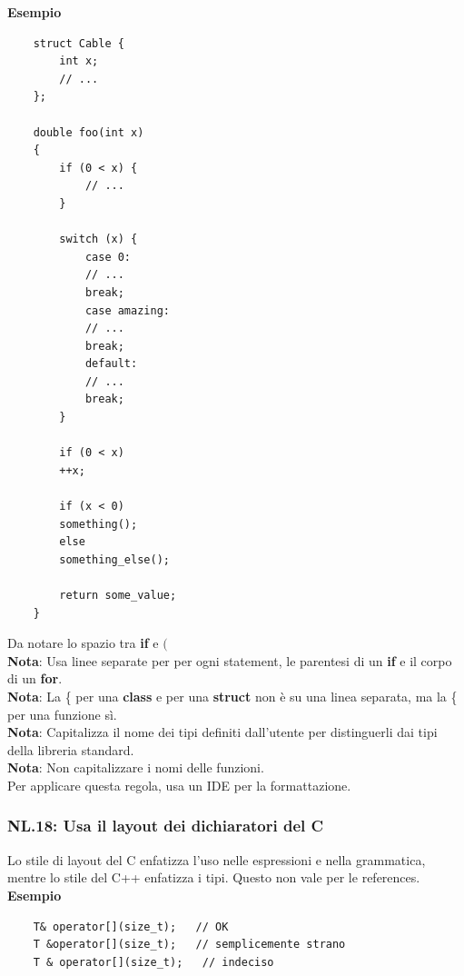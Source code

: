 \textsf{\small \textbf{Esempio}}

\begin{lstlisting}
	struct Cable {
		int x;
		// ...
	};
	
	double foo(int x)
	{
		if (0 < x) {
			// ...
		}
		
		switch (x) {
			case 0:
			// ...
			break;
			case amazing:
			// ...
			break;
			default:
			// ...
			break;
		}
		
		if (0 < x)
		++x;
		
		if (x < 0)
		something();
		else
		something_else();
		
		return some_value;
	}
\end{lstlisting}

\textsf{\small Da notare lo spazio tra \textbf{if} e \textbf{$($}} \\

\textsf{\small \textbf{Nota}: Usa linee separate per per ogni statement, le parentesi di un \textbf{if} e il corpo di un \textbf{for}.} \\

\textsf{\small \textbf{Nota}: La \{ per una \textbf{class} e per una \textbf{struct} non è su una linea separata, ma la \{ per una funzione sì.} \\

\textsf{\small \textbf{Nota}: Capitalizza il nome dei tipi definiti dall'utente per distinguerli dai tipi della libreria standard.} \\

\textsf{\small \textbf{Nota}: Non capitalizzare i nomi delle funzioni.} \\

\textsf{\small Per applicare questa regola, usa un IDE per la formattazione.} \\

\subsubsection{NL.18: Usa il layout dei dichiaratori del C}

\textsf{\small Lo stile di layout del C enfatizza l'uso nelle espressioni e nella grammatica, mentre lo stile del C++ enfatizza i tipi. Questo non vale per le references.} \\ %

\textsf{\small \textbf{Esempio}} 

\begin{lstlisting}
	T& operator[](size_t);   // OK
	T &operator[](size_t);   // semplicemente strano
	T & operator[](size_t);   // indeciso
\end{lstlisting}

